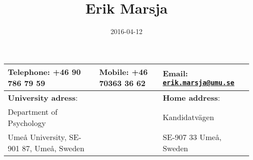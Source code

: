 \documentclass[]{article}
\title{Erik Marsja}
\author{}
\date{2016-04-12}
\begin{document}
\maketitle

\begin{longtable}[c]{@{}lll@{}}
\toprule
\begin{minipage}[b]{0.41\columnwidth}\raggedright\strut
\textbf{Telephone}: +46 90 786 79 59
\strut\end{minipage} &
\begin{minipage}[b]{0.27\columnwidth}\raggedright\strut
\textbf{Mobile}: +46 70363 36 62
\strut\end{minipage} &
\begin{minipage}[b]{0.27\columnwidth}\raggedright\strut
\textbf{Email}:
\href{mailto:erik.marsja@umu.se}{\nolinkurl{erik.marsja@umu.se}}
\strut\end{minipage}\tabularnewline
\midrule
\endhead
\begin{minipage}[t]{0.41\columnwidth}\raggedright\strut
\textbf{University adress}:
\strut\end{minipage} &
\begin{minipage}[t]{0.27\columnwidth}\raggedright\strut
\strut\end{minipage} &
\begin{minipage}[t]{0.27\columnwidth}\raggedright\strut
\textbf{Home address}:
\strut\end{minipage}\tabularnewline
\begin{minipage}[t]{0.41\columnwidth}\raggedright\strut
Department of Psychology
\strut\end{minipage} &
\begin{minipage}[t]{0.27\columnwidth}\raggedright\strut
\strut\end{minipage} &
\begin{minipage}[t]{0.27\columnwidth}\raggedright\strut
Kandidatvägen
\strut\end{minipage}\tabularnewline
\begin{minipage}[t]{0.41\columnwidth}\raggedright\strut
Umeå University, SE-901 87, Umeå, Sweden
\strut\end{minipage} &
\begin{minipage}[t]{0.27\columnwidth}\raggedright\strut
\strut\end{minipage} &
\begin{minipage}[t]{0.27\columnwidth}\raggedright\strut
SE-907 33 Umeå, Sweden
\strut\end{minipage}\tabularnewline
\bottomrule
\end{longtable}
\end{document}
